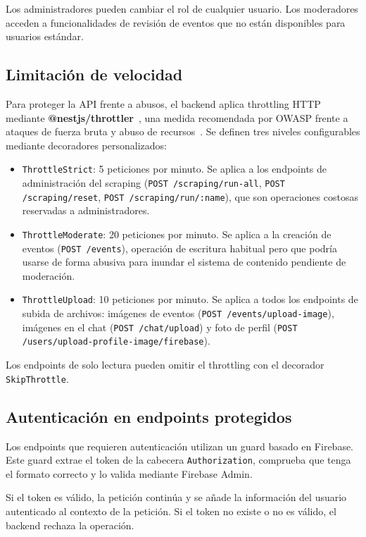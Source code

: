 Los administradores pueden cambiar el rol de cualquier usuario. Los moderadores acceden a funcionalidades de revisión de eventos que no están disponibles para usuarios estándar.

\subsection{Limitación de velocidad}

Para proteger la API frente a abusos, el backend aplica throttling HTTP mediante \textbf{@nestjs/throttler}~\cite{nestjsthrottler}, una medida recomendada por OWASP frente a ataques de fuerza bruta y abuso de recursos~\cite{owasp2021}. Se definen tres niveles configurables mediante decoradores personalizados:

\begin{itemize}
    \item \texttt{ThrottleStrict}: 5 peticiones por minuto. Se aplica a los endpoints de administración del scraping (\texttt{POST /scraping/run-all}, \texttt{POST /scraping/reset}, \texttt{POST /scraping/run/:name}), que son operaciones costosas reservadas a administradores.
    \item \texttt{ThrottleModerate}: 20 peticiones por minuto. Se aplica a la creación de eventos (\texttt{POST /events}), operación de escritura habitual pero que podría usarse de forma abusiva para inundar el sistema de contenido pendiente de moderación.
    \item \texttt{ThrottleUpload}: 10 peticiones por minuto. Se aplica a todos los endpoints de subida de archivos: imágenes de eventos (\texttt{POST /events/upload-image}), imágenes en el chat (\texttt{POST /chat/upload}) y foto de perfil (\texttt{POST /users/upload-profile-image/firebase}).
\end{itemize}

Los endpoints de solo lectura pueden omitir el throttling con el decorador \texttt{SkipThrottle}.

\subsection{Autenticación en endpoints protegidos}

Los endpoints que requieren autenticación utilizan un guard basado en Firebase. Este guard extrae el token de la cabecera \texttt{Authorization}, comprueba que tenga el formato correcto y lo valida mediante Firebase Admin.

Si el token es válido, la petición continúa y se añade la información del usuario autenticado al contexto de la petición. Si el token no existe o no es válido, el backend rechaza la operación.

